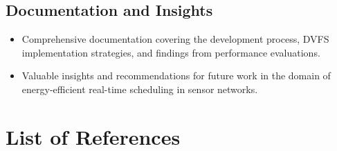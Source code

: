 \documentclass[twocolumn, 10pt]{article}
\begin{document}
\subsection*{Documentation and Insights}
\begin{itemize}
    \item Comprehensive documentation covering the development process, DVFS implementation strategies, and findings from performance evaluations.
    \item Valuable insights and recommendations for future work in the domain of energy-efficient real-time scheduling in sensor networks.
\end{itemize}

\section*{List of References}
\nocite{*}  
\printbibliography[heading=none]  
\end{document}
